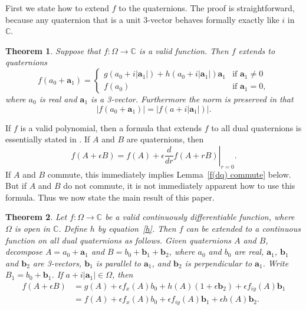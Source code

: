 \documentclass[12pt,reqno]{amsart}
\newtheorem{theorem}{Theorem}
\begin{document}
First we state how to extend $f$ to the quaternions.  The proof is straightforward, because any quaternion that is a unit 3-vector behaves formally exactly like $i$ in $\mathbb C$.

\begin{theorem}
\label{f(q)}
Suppose that $f:\Omega \to \mathbb C$ is a valid function.  Then $f$ extends to quaternions
\begin{equation}
f(a_0 + \bm a_1) = \begin{cases}
g(a_0+i|\bm a_1|) +h(a_0+i|\bm a_1|) \bm a_1 & \text{if $\bm a_1 \ne 0$} \\
f(a_0) & \text{if $\bm a_1 = 0$}, \end{cases}
\end{equation}
where $a_0$ is real and $\bm a_1$ is a 3-vector.  Furthermore the norm is preserved in that
\begin{equation}
| f(a_0 + \bm a_1) | = | f(a + i |\bm a_1|) | .
\end{equation}
\end{theorem}

If $f$ is a valid polynomial, then a formula that extends $f$ to all dual quaternions is essentially stated in \cite{wiki-1}.  If $A$ and $B$ are quaternions, then
\begin{equation}
\label{proto f(dq)}
f(A + \epsilon B) = f(A) + \epsilon \left.\frac d{dr} f(A + rB) \right|_{r=0}.
\end{equation}
If $A$ and $B$ commute, this immediately implies Lemma~\ref{f(dq) commute} below.  But if $A$ and $B$ do not commute, it is not immediately apparent how to use this formula.  Thus we now state the main result of this paper.

\begin{theorem}
\label{f(dq)}
Let $f:\Omega \to \mathbb C$ be a valid continuously differentiable function, where $\Omega$ is open in $\mathbb C$.  Define $h$ by equation~\eqref{h}.  Then $f$ can be extended to a continuous function on all dual quaternions as follows.  Given quaternions $A$ and $B$, decompose $A = a_0 + \bm a_1$ and $B = b_0 + \bm b_1 + \bm b_2$, where $a_0$ and $b_0$ are real, $\bm a_1$, $\bm b_1$ and $\bm b_2$ are 3-vectors, $\bm b_1$ is parallel to $\bm a_1$, and $\bm b_2$ is perpendicular to $\bm a_1$.  Write $B_1 = b_0 + \bm b_1$.  If $a + i |\bm a_1| \in \Omega$, then
\begin{align}
f(A + \epsilon B)
&= g(A) 
+ \epsilon f_x(A) b_0
+ h(A) (1 + \epsilon \bm b_2)
+ \epsilon f_{iy}(A) \bm b_1 \\
&= f(A) 
+ \epsilon f_x(A) b_0
+ \epsilon f_{iy}(A) \bm b_1
+ \epsilon h(A) \bm b_2 .
\end{align}
\end{theorem}
\end{document}
